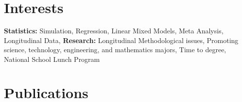 \documentclass[]{friggeri-cv} %
\begin{document}
\section{Interests}

\textbf{Statistics:} Simulation, Regression, Linear Mixed Models, Meta Analysis, Longitudinal Data,  \textbf{Research:} Longitudinal Methodological issues, Promoting science, technology, engineering, and mathematics majors, Time to degree, National School Lunch Program


\section{Publications}

\begin{refsection} %
\nocite{*}
\printbibliography[sorting=chronological, type=article, title={Published Articles}, notkeyword={In Press}, heading=subbibliography]
\end{refsection} 

\begin{refsection} %
\nocite{*}
\printbibliography[sorting=chronological, type=article, title={Articles In Press}, keyword={In Press}, heading=subbibliography]
\end{refsection} 






\end{document}
